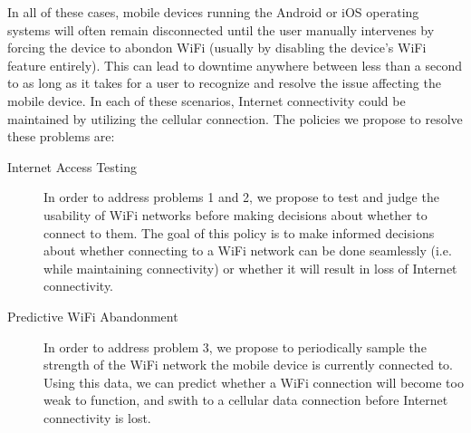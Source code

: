 In all of these cases, mobile devices running the Android or iOS operating systems will often remain disconnected until the user manually intervenes by forcing the device to abondon WiFi (usually by disabling the device's WiFi feature entirely). This can lead to downtime anywhere between less than a second to as long as it takes for a user to recognize and resolve the issue affecting the mobile device. In each of these scenarios, Internet connectivity could be maintained by utilizing the cellular connection. The policies we propose to resolve these problems are:

\begin{description}
\item[Internet Access Testing] In order to address problems 1 and 2, we propose to test and judge the usability of WiFi networks before making decisions about whether to connect to them. The goal of this policy is to make informed decisions about whether connecting to a WiFi network can be done seamlessly (i.e. while maintaining connectivity) or whether it will result in loss of Internet connectivity.
\item[Predictive WiFi Abandonment] In order to address problem 3, we propose to periodically sample the strength of the WiFi network the mobile device is currently connected to. Using this data, we can predict whether a WiFi connection will become too weak to function, and swith to a cellular data connection before Internet connectivity is lost.
\end{description}

